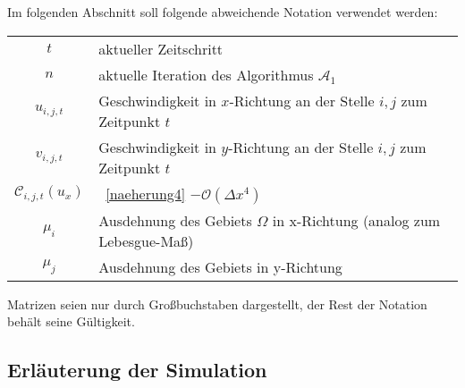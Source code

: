 Im folgenden Abschnitt soll folgende abweichende Notation verwendet werden:
\begin{table}[H]
    \begin{tabular}{c l}
        $t$ & aktueller Zeitschritt \\
        $n$ & aktuelle Iteration des Algorithmus $\mathcal{A}_1$ \\
        $u_{i,j,t}$ & Geschwindigkeit in $x$-Richtung an der Stelle $i,j$ zum Zeitpunkt $t$ \\
        $v_{i,j,t}$ & Geschwindigkeit in $y$-Richtung an der Stelle $i,j$ zum Zeitpunkt $t$ \\
        $\mathcal{C}_{i,j,t}(u_x)$ & ~\eqref{naeherung4} $- \mathcal{O}(\Delta x^4)$ \\
        $\mu_i$ & Ausdehnung des Gebiets $\Omega$ in x-Richtung (analog zum Lebesgue-Maß) \\
        $\mu_j$ & Ausdehnung des Gebiets in y-Richtung \\
    \end{tabular}
\end{table}
Matrizen seien nur durch Großbuchstaben dargestellt, der Rest der Notation behält seine Gültigkeit.

\subsection{Erläuterung der Simulation}
\label{sec:sim}

